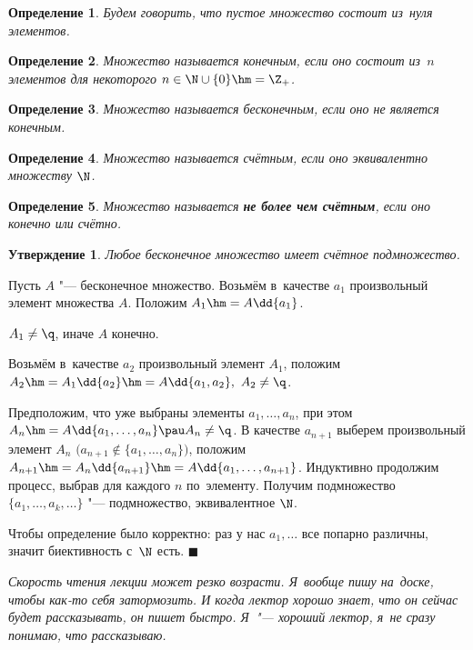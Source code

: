 \documentclass[a4paper,10pt,twoside]{article}
\newtheorem{Def}{Определение}[section]
\newtheorem{Ut}{Утверждение}[section]
\newenvironment{Proof}
       {\par\noindent{\textbf{Доказательство.}}}
       {\hfill$\scriptstyle\blacksquare$}
\begin{document}
\begin{Def}
Будем говорить, что пустое множество состоит из~нуля элементов.
\end{Def}

\begin{Def}
Множество называется конечным, если оно состоит из~$n$ элементов для некоторого $n\in \N\cup\{0\}\hm=\Z_+$.
\end{Def}

\begin{Def}
Множество называется бесконечным, если оно не является конечным.
\end{Def}

\begin{Def}
Множество называется счётным, если оно эквивалентно множеству $\N$.
\end{Def}

\begin{Def}
Множество называется \textbf{не более чем счётным}, если оно конечно или счётно.
\end{Def}

\begin{Ut}
Любое бесконечное множество имеет счётное подмножество.
\end{Ut}

\begin{Proof}
Пусть $A$ "--- бесконечное множество. Возьмём в~качестве $a_1$ произвольный элемент множества $A$. Положим $A_1\hm=A\dd\{a_1\}$.

$A_1\neq\q$, иначе $A$ конечно.

Возьмём в~качестве $a_2$ произвольный элемент $A_1$, положим $A_2\hm=A_1\dd\{a_2\}\hm=A\dd\{a_1,a_2\},\ A_2\neq\q$.

Предположим, что уже выбраны элементы $a_1,\ldots,a_n$, при этом
$A_n\hm=A\dd\{a_1,\ldots,a_n\}\pau A_n\neq\q$.
В качестве $a_{n+1}$ выберем произвольный элемент $A_n$
$\big(a_{n+1}\nin\{a_1,\ldots,a_n\}\big)$, положим $A_{n+1}\hm=
A_n\dd\{a_{n+1}\}\hm=A\dd\{a_1,\ldots,a_{n+1}\}$. Индуктивно продолжим процесс, выбрав для каждого $n$ по~элементу.
 Получим подмножество $\{a_1,\ldots,a_k,\ldots\}$ "--- подмножество, эквивалентное $\N$.

Чтобы определение было корректно: раз у нас $a_1,\ldots$ все попарно различны, значит биективность с~$\N$ есть.
\end{Proof}

\textit{Скорость чтения лекции может резко возрасти. Я~вообще пишу на~доске, чтобы как-то себя затормозить.
 И когда лектор хорошо знает, что он сейчас будет рассказывать, он пишет быстро.
  Я~"--- хороший лектор, я~не сразу понимаю, что рассказываю.}
\end{document}
